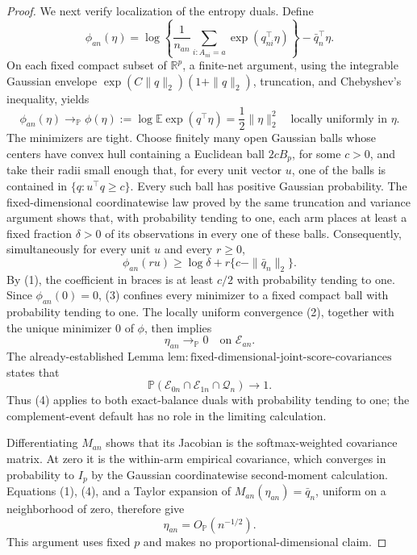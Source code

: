 \documentclass{article}
\begin{document}
\begin{proof}
We next verify localization of the entropy duals.  Define
\[
 \phi_{an}(\eta)=
 \log\!\left\{\frac1{n_{an}}\sum_{i:A_{ni}=a}
        \exp(q_{ni}^{\top}\eta)\right\}-\bar q_n^\top\eta .
\]
On each fixed compact subset of \(\mathbb R^p\), a finite-net argument,
using the integrable Gaussian envelope
\(\exp(C\|q\|_2)(1+\|q\|_2)\), truncation, and Chebyshev's inequality,
yields
\[
 \phi_{an}(\eta)\longrightarrow_{\mathbb P}
 \phi(\eta):=\log\mathbb E\exp(q^\top\eta)
 =\frac12\|\eta\|_2^2
 \quad\text{locally uniformly in }\eta .
 \tag{2}
\]
The minimizers are tight.  Choose finitely many open Gaussian balls whose
centers have convex hull containing a Euclidean ball \(2cB_p\), for some
\(c>0\), and take their radii small enough that, for every unit vector
\(u\), one of the balls is contained in \(\{q:u^\top q\ge c\}\).  Every
such ball has positive Gaussian probability.  The fixed-dimensional
coordinatewise law proved by the same truncation and variance argument shows
that, with probability tending to one, each arm places at least a fixed
fraction \(\delta>0\) of its observations in every one of these balls.
Consequently, simultaneously for every unit \(u\) and every \(r\ge0\),
\[
 \phi_{an}(ru)
 \ge \log\delta+r\{c-\|\bar q_n\|_2\}.
 \tag{3}
\]
By (1), the coefficient in braces is at least \(c/2\) with probability
tending to one.  Since \(\phi_{an}(0)=0\), (3) confines every minimizer to a
fixed compact ball with probability tending to one.  The locally uniform
convergence (2), together with the unique minimizer \(0\) of \(\phi\), then
implies
\[
 \eta_{an}\longrightarrow_{\mathbb P}0
 \quad\text{on }\mathcal E_{an}.
 \tag{4}
\]
The already-established Lemma
\(\mathrm{lem{:}fixed\mbox{-}dimensional\mbox{-}joint\mbox{-}score\mbox{-}covariances}\)
states that
\[
 \mathbb P(\mathcal E_{0n}\cap\mathcal E_{1n}\cap\mathcal Q_n)
 \longrightarrow1.
 \tag{5}
\]
Thus (4) applies to both exact-balance duals with probability tending to one;
the complement-event default has no role in the limiting calculation.

Differentiating \(M_{an}\) shows that its Jacobian is the softmax-weighted
covariance matrix.  At zero it is the within-arm empirical covariance, which
converges in probability to \(I_p\) by the Gaussian coordinatewise
second-moment calculation.  Equations (1), (4), and a Taylor expansion of
\(M_{an}(\eta_{an})=\bar q_n\), uniform on a neighborhood of zero, therefore
give
\[
 \eta_{an}=O_{\mathbb P}(n^{-1/2}).
 \tag{6}
\]
This argument uses fixed \(p\) and makes no proportional-dimensional claim.


\end{proof}
\end{document}
